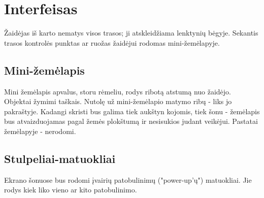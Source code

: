 \section{Interfeisas}

Žaidėjas iš karto nematys visos trasos; ji atskleidžiama lenktynių bėgyje.
Sekantis trasos kontrolės punktas ar ruožas žaidėjui rodomas mini-žemėlapyje.

	\subsection{Mini-žemėlapis}
	Mini žemėlapis apvalus, storu rėmeliu, rodys ribotą atstumą nuo žaidėjo.
	Objektai žymimi taškais.
	Nutolę už mini-žemėlapio matymo ribų - liks jo pakraštyje.
	Kadangi skristi bus galima tiek aukštyn kojomis, tiek šonu - žemėlapis bus atvaizduojamas pagal žemės plokštumą ir nesisukios judant veikėjui.
	Pastatai žemėlapyje - nerodomi.
	
	\subsection{Stulpeliai-matuokliai}
	Ekrano šonuose bus rodomi įvairių patobulinimų ("power-up'ų") matuokliai.
	Jie rodys kiek liko vieno ar kito patobulinimo.